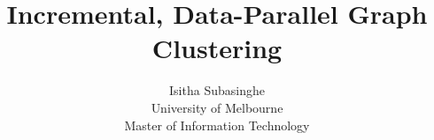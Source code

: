 \documentclass[11pt,oneside]{book}
\title{Incremental, Data-Parallel Graph Clustering}
\author{Isitha Subasinghe\\University of Melbourne\\Master of Information Technology}
\date{}
\begin{document}
\maketitle






\tableofcontents








\nocite{*}


\end{document}

